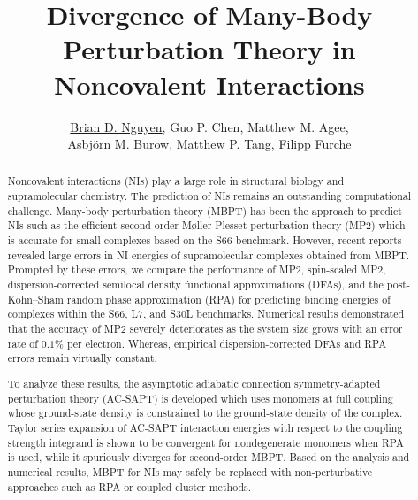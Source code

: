 \documentclass[12pt]{article}
\title{Divergence of Many-Body Perturbation Theory in Noncovalent Interactions}
\author{\underline{Brian D. Nguyen},
  Guo P. Chen, Matthew M. Agee, \\ Asbj{\"o}rn M. Burow,
  Matthew P. Tang,
  Filipp Furche}
\begin{document}
\maketitle

\begin{abstract}
  Noncovalent interactions (NIs) play a large role in structural biology
  and supramolecular chemistry. The prediction of NIs remains an outstanding
  computational challenge. Many-body perturbation theory (MBPT) has been the
  approach to predict NIs such as the efficient second-order M{\o}ller-Plesset
  perturbation theory (MP2) which is accurate for small complexes
  based on the S66 benchmark. However, recent reports revealed large errors
  in NI energies of supramolecular complexes obtained from MBPT.
  Prompted by these errors, we compare the performance of MP2, spin-scaled MP2,
  dispersion-corrected semilocal density functional approximations (DFAs),
  and the post-Kohn--Sham random phase approximation (RPA) for predicting binding
  energies of complexes within the S66, L7, and S30L benchmarks. Numerical
  results demonstrated that the accuracy of MP2 severely deteriorates as
  the system size grows with an error rate of $0.1\%$ per electron.
  Whereas, empirical dispersion-corrected DFAs and RPA errors remain virtually
  constant.

  To analyze these results, the asymptotic adiabatic connection
  symmetry-adapted perturbation theory (AC-SAPT) is developed which uses
  monomers at full coupling whose ground-state density is constrained to
  the ground-state density of the complex. Taylor series expansion of AC-SAPT
  interaction energies with respect to the coupling strength integrand is
  shown to be convergent for nondegenerate monomers when RPA is used, while it
  spuriously diverges for second-order MBPT. Based on the analysis and numerical
  results, MBPT for NIs may safely be replaced with non-perturbative approaches
  such as RPA or coupled cluster methods.

\end{abstract}
\end{document}
